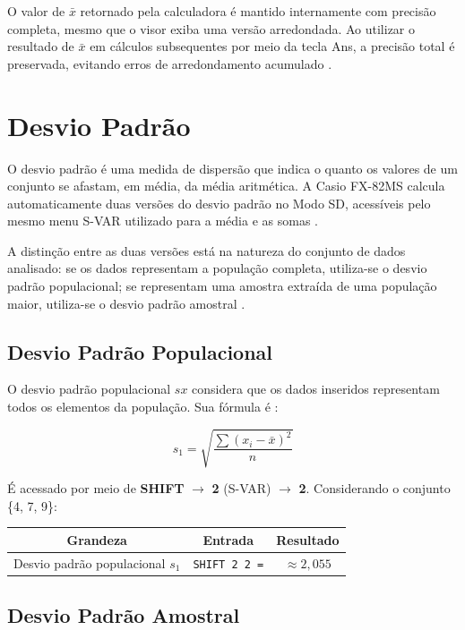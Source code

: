 O valor de $\bar{x}$ retornado pela calculadora é mantido internamente com precisão completa, mesmo que o visor exiba uma versão arredondada. Ao utilizar o resultado de $\bar{x}$ em cálculos subsequentes por meio da tecla Ans, a precisão total é preservada, evitando erros de arredondamento acumulado \cite{casio2004}.

\section{Desvio Padrão}

O desvio padrão é uma medida de dispersão que indica o quanto os valores de um conjunto se afastam, em média, da média aritmética. A Casio FX-82MS calcula automaticamente duas versões do desvio padrão no Modo SD, acessíveis pelo mesmo menu S-VAR utilizado para a média e as somas \cite{casio2004}.

A distinção entre as duas versões está na natureza do conjunto de dados analisado: se os dados representam a população completa, utiliza-se o desvio padrão populacional; se representam uma amostra extraída de uma população maior, utiliza-se o desvio padrão amostral \cite{casio2004}.

\subsection{Desvio Padrão Populacional}

O desvio padrão populacional $s x$ considera que os dados inseridos
representam todos os elementos da população. Sua fórmula é \cite{casio2004}:

\[
    s_1 = \sqrt{\frac{\sum (x_i - \bar{x})^2}{n}}
\]

É acessado por meio de \textbf{SHIFT} $\to$ \textbf{2} (S-VAR) $\to$
\textbf{2}. Considerando o conjunto \{4, 7, 9\}:

\begin{table}[H]
    \centering
    \begin{tabular}{|c|c|c|}
        \hline
        \textbf{Grandeza} & \textbf{Entrada} & \textbf{Resultado} \\ \hline
        Desvio padrão populacional $s_1$ & \texttt{SHIFT 2 2 =} & $\approx 2{,}055$ \\ \hline
    \end{tabular}
\end{table}

\subsection{Desvio Padrão Amostral}

